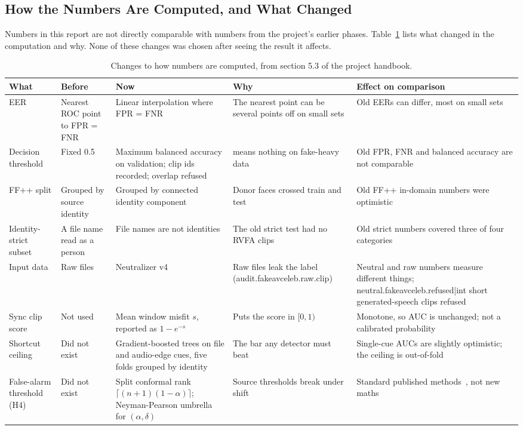 \subsection{How the Numbers Are Computed, and What Changed}

Numbers in this report are not directly comparable with numbers from the
project's earlier phases. Table~\ref{tab:changes} lists what changed in the
computation and why. None of these changes was chosen after seeing the result
it affects.

\begin{table}[ht]
    \centering
    \footnotesize
    \caption{Changes to how numbers are computed, from section 5.3 of the project handbook.}
    \label{tab:changes}
    \begin{tabularx}{\textwidth}{@{}>{\raggedright\arraybackslash}p{2.0cm} >{\raggedright\arraybackslash}p{2.2cm} >{\raggedright\arraybackslash}X >{\raggedright\arraybackslash}p{3.0cm} >{\raggedright\arraybackslash}p{3.2cm}@{}}
        \toprule
        \textbf{What} & \textbf{Before} & \textbf{Now} & \textbf{Why} & \textbf{Effect on comparison} \\
        \midrule
        EER & Nearest ROC point to FPR = FNR & Linear interpolation where FPR = FNR & The nearest point can be several points off on small sets & Old EERs can differ, most on small sets \\
        Decision threshold & Fixed 0.5 & Maximum balanced accuracy on validation; clip ids recorded; overlap refused & 0.5 means nothing on fake-heavy data & Old FPR, FNR and balanced accuracy are not comparable \\
        FF++ split & Grouped by source identity & Grouped by connected identity component & Donor faces crossed train and test & Old FF++ in-domain numbers were optimistic \\
        Identity-strict subset & A file name read as a person & File names are not identities & The old strict test had no RVFA clips & Old strict numbers covered three of four categories \\
        Input data & Raw files & Neutralizer v4 & Raw files leak the label ({{audit.fakeavceleb.raw.clip}}) & Neutral and raw numbers measure different things; {{neutral.fakeavceleb.refused|int}} short generated-speech clips refused \\
        Sync clip score & Not used & Mean window misfit $s$, reported as $1 - e^{-s}$ & Puts the score in $[0, 1)$ & Monotone, so AUC is unchanged; not a calibrated probability \\
        Shortcut ceiling & Did not exist & Gradient-boosted trees on file and audio-edge cues, five folds grouped by identity & The bar any detector must beat & Single-cue AUCs are slightly optimistic; the ceiling is out-of-fold \\
        False-alarm threshold (H4) & Did not exist & Split conformal rank $\lceil (n+1)(1-\alpha) \rceil$; Neyman-Pearson umbrella for $(\alpha, \delta)$ & Source thresholds break under shift & Standard published methods~\cite{bates2023,tong2018}, not new maths \\
        \bottomrule
    \end{tabularx}
\end{table}

